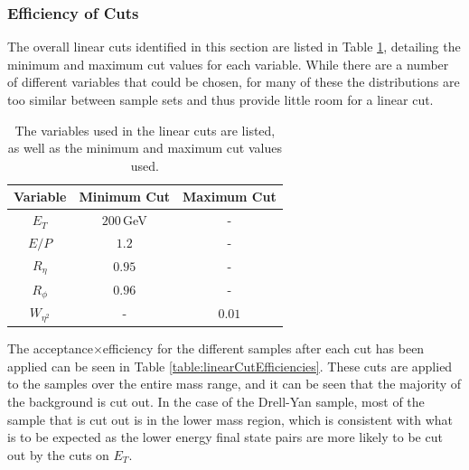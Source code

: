 \documentclass{article}
\begin{document}

\subsubsection{Efficiency of Cuts}

The overall linear cuts identified in this section are listed in Table \ref{table:linearCuts}, detailing the minimum and maximum cut values for each variable. While there are a number of different variables that could be chosen, for many of these the distributions are too similar between sample sets and thus provide little room for a linear cut. 

\begin{table}[h!t]
\centering
\caption{The variables used in the linear cuts are listed, as well as the minimum and maximum cut values used. \label{table:linearCuts}}
\begin{tabular}{|c|c|c| } 
\hline
Variable & Minimum Cut & Maximum Cut\\\hline
$E_T$ & $200\,$GeV  & - \\\hline
$E/P$ & $1.2$  & - \\\hline
$R_{\eta}$ & $0.95$ & - \\\hline
$R_{\phi}$ & $0.96$ & -\\\hline
$W_{\eta^2}$ & - & $0.01$\\\hline
\end{tabular}
\end{table}

The acceptance$\times$efficiency for the different samples after each cut has been applied can be seen in Table \ref{table:linearCutEfficiencies}. These cuts are applied to the samples over the entire mass range, and it can be seen that the majority of the background is cut out. In the case of the Drell-Yan sample, most of the sample that is cut out is in the lower mass region, which is consistent with what is to be expected as the lower energy final state pairs are more likely to be cut out by the cuts on $E_T$.
\end{document}
